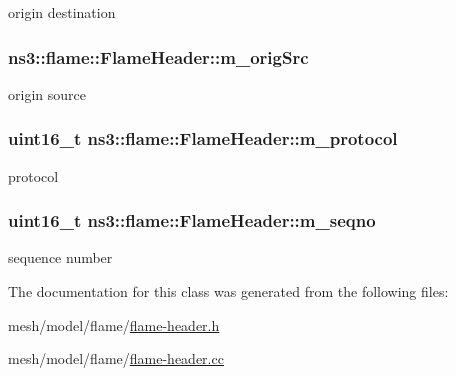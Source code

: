 origin destination 

\subsubsection[{\texorpdfstring{m\+\_\+orig\+Src}{m_origSrc}}]{ ns3\+::flame\+::\+Flame\+Header\+::m\+\_\+orig\+Src\hspace{0.3cm}{\ttfamily [private]}}\hypertarget{classns3_1_1flame_1_1FlameHeader_ac96cf4f51d80425b06d14eaac936348b}{}\label{classns3_1_1flame_1_1FlameHeader_ac96cf4f51d80425b06d14eaac936348b}


origin source 

\subsubsection[{\texorpdfstring{m\+\_\+protocol}{m_protocol}}]{\setlength{\rightskip}{0pt plus 5cm}uint16\+\_\+t ns3\+::flame\+::\+Flame\+Header\+::m\+\_\+protocol\hspace{0.3cm}{\ttfamily [private]}}\hypertarget{classns3_1_1flame_1_1FlameHeader_a2d6d58622168d0626903ffc45a066569}{}\label{classns3_1_1flame_1_1FlameHeader_a2d6d58622168d0626903ffc45a066569}


protocol 

\subsubsection[{\texorpdfstring{m\+\_\+seqno}{m_seqno}}]{\setlength{\rightskip}{0pt plus 5cm}uint16\+\_\+t ns3\+::flame\+::\+Flame\+Header\+::m\+\_\+seqno\hspace{0.3cm}{\ttfamily [private]}}\hypertarget{classns3_1_1flame_1_1FlameHeader_a47aa4a93caa305da7ed2e7a725b9ec25}{}\label{classns3_1_1flame_1_1FlameHeader_a47aa4a93caa305da7ed2e7a725b9ec25}


sequence number 



The documentation for this class was generated from the following files\+:\begin{DoxyCompactItemize}
\item 
mesh/model/flame/\hyperlink{flame-header_8h}{flame-\/header.\+h}\item 
mesh/model/flame/\hyperlink{flame-header_8cc}{flame-\/header.\+cc}\end{DoxyCompactItemize}
